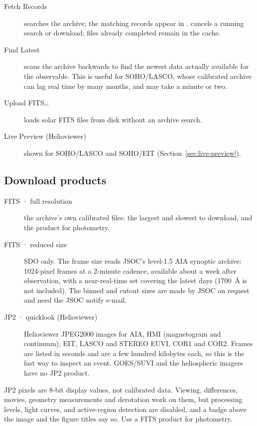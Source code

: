 \begin{description}
  \item[Fetch Records] searches the archive; the matching records appear in
    .  cancels a running search or download; files already
    completed remain in the cache.
  \item[Find Latest] scans the archive backwards to find the newest data actually available
    for the observable. This is useful for SOHO/LASCO, whose calibrated archive can lag real
    time by many months, and may take a minute or two.
  \item[Upload FITS…] loads solar FITS files from disk without an archive search.
  \item[Live Preview (Helioviewer)] shown for SOHO/LASCO and SOHO/EIT
    (Section~\ref{sec:live-preview}).
\end{description}

\subsection{Download products}
\label{sec:solar-products}

\begin{description}
  \item[FITS · full resolution] the archive's own calibrated files: the largest and slowest
    to download, and the product for photometry.
  \item[FITS · reduced size] SDO only. The  frame size reads
    JSOC's level-1.5 AIA synoptic archive: 1024-pixel frames at a 2-minute cadence, available
    about a week after observation, with a near-real-time set covering the latest days
    (1700~Å is not included). The binned and cutout sizes are made by JSOC on request and need
    the JSOC notify e-mail.
  \item[JP2 · quicklook (Helioviewer)] Helioviewer JPEG2000 images for AIA, HMI (magnetogram and
    continuum), EIT, LASCO and STEREO EUVI, COR1 and COR2. Frames are listed in seconds and are
    a few hundred kilobytes each, so this is the fast way to inspect an event. GOES/SUVI and the
    heliospheric imagers have no JP2 product.
\end{description}

\begin{caution}
  JP2 pixels are 8-bit display values, not calibrated data. Viewing, differences, movies,
  geometry measurements and derotation work on them, but processing levels, light curves,
   and active-region detection are disabled, and a  badge above the image and the figure titles say so. Use a FITS product for
  photometry.
\end{caution}

